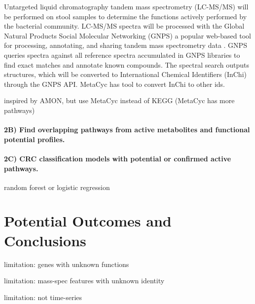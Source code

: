 \documentclass[11pt]{article}
\begin{document}
Untargeted liquid chromatography tandem mass spectrometry (LC-MS/MS) will be performed on stool samples to determine the functions actively performed by the bacterial community.
LC-MS/MS spectra will be processed with the Global Natural Products Social Molecular Networking (GNPS) a popular web-based tool for processing, annotating, and sharing tandem mass spectrometry data \cite{wang_sharing_2016}.
GNPS queries spectra against all reference spectra accumulated in GNPS libraries to find exact matches and annotate known compounds.
The spectral search outputs structures, which will be converted to International Chemical Identifiers (InChi) through the GNPS API. MetaCyc has tool to convert InChi to other ids.

inspired by AMON, but use MetaCyc instead of KEGG (MetaCyc has more pathways)

\paragraph{2B) Find overlapping pathways from active metabolites and functional potential profiles.}

\paragraph{2C) CRC classification models with potential or confirmed active pathways.}

random forest or logistic regression

\section*{Potential Outcomes and Conclusions}

limitation: genes with unknown functions

limitation: mass-spec features with unknown identity

limitation: not time-series

\pagebreak
\footnotesize{

\par}
\end{document}
